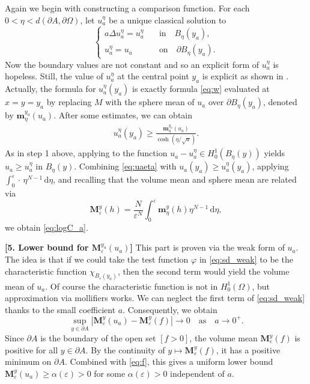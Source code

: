 \documentclass[graybox]{svmult}
\newcommand{\ep}{\varepsilon}
\renewcommand{\d}{\mathrm{d}}  %
\renewcommand{\AA}{A}  %
\newcommand{\vmean}{\mathbf{M}}  %
\newcommand{\smean}{\mathbf{m}}  %
\begin{document}
Again we begin with constructing a comparison function. For each  $0<\eta<  d(\partial \AA, \partial \Omega)$, let $u_a^\eta$ be a unique classical solution to
\begin{equation*}
\begin{cases}
a\Delta u_a^\eta = u_a^\eta & \quad \text{in}\quad B_\eta(y_a),\\
u_a^\eta={u}_a& \quad \text{on}\quad \partial B_\eta(y_a).
\end{cases}
\end{equation*}
Now the boundary values are not constant and so an explicit form of $u_a^\eta$ is hopeless. Still, the value of $u_a^\eta$ at the central point $y_a$ is explicit as shown in  \cite{Kuz}. Actually, the formula for $u_a^\eta(y_a)$ is  exactly formula \eqref{eq:w} evaluated at $x=y=y_a$ by replacing $M$ with the sphere mean of  $u_a$ over $\partial B_\eta(y_a)$, denoted by $\smean_\eta^{y_a}({u}_a)$. After some estimates, we can obtain 
\begin{align}\label{eq:uaeta}
u_a^\eta(y_a) \ge \frac{\smean_\eta^{y_a}({u}_a)}{ \cosh(\eta/\sqrt{a})}.   
\end{align}   
As in step 1 above, applying \cite[Theorem 9.27]{B11} to the function $u_a - u_a^\eta\in H_0^1(B_\eta(y))$ yields $u_a \ge u_a^\eta$ in $B_\eta(y)$. Combining \eqref{eq:uaeta} with $u_a(y_a)\ge u_a^\eta(y_a)$, applying $\int_0^\ep \cdot\, \eta^{N-1}\,\d \eta$, and recalling that the volume mean and sphere mean are related via
\begin{equation*}%
    \vmean_\ep^y(h) 
    = \frac{N}{\ep^N} \int_0^\ep     \smean_\eta^y(h)\eta^{N-1}\, \d \eta,    
\end{equation*}
we obtain \eqref{eq:logC_a}. 



\vspace{3mm}
\noindent
\textbf{[5. Lower bound for $\vmean_{\ep}^{y_a}({u_a})$]\hspace{2mm}}  This part is proven via the weak form of $u_a$. The idea is that  if we could take the test function $\varphi$ in \eqref{eq:sd_weak} to be the characteristic function $\chi_{B_\ep(y_a)}$, then the second term would yield the volume mean of $u_a$. Of course the characteristic function is not in $H_0^1(\Omega)$, but approximation via mollifiers works. We can neglect the first term of \eqref{eq:sd_weak} thanks to the small coefficient $a$. Consequently, we obtain 
\begin{equation}\label{eq:f}
\sup_{y\in \partial \AA} |\vmean_\ep^y(u_a) - \vmean_\ep^y(f)| \to 0 \quad \text{as}\quad a \to0^+. 
\end{equation}
Since $\partial \AA$ is the boundary of the open set $[f>0]$,  the volume mean $\vmean_\ep^y(f)$ is positive for all $y \in \partial \AA$. By the continuity of $y\mapsto \vmean_\ep^y(f)$, it has a positive minimum on $\partial \AA$. Combined with \eqref{eq:f}, this gives a uniform lower bound $\vmean_\ep^y(u_a) \ge \alpha(\ep) >0$ for some $\alpha(\ep)>0$ independent of $a$. 
\end{document}
